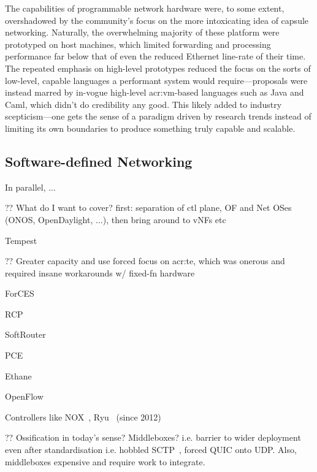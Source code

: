 The capabilities of programmable network hardware were, to some extent, overshadowed by the community's focus on the more intoxicating idea of capsule networking.
Naturally, the overwhelming majority of these platform were prototyped on host machines, which limited forwarding and processing performance far below that of even the reduced Ethernet line-rate of their time.
The repeated emphasis on high-level prototypes reduced the focus on the sorts of low-level, capable languages a performant system would require---proposals were instead marred by in-vogue high-level \gls{acr:vm}-based languages such as Java and Caml, which didn't do credibility any good.
This likely added to industry scepticism---one gets the sense of a paradigm driven by research trends instead of limiting its own boundaries to produce something truly capable and scalable.

\subsection{Software-defined Networking}
In parallel, ...

?? What do I want to cover? first: separation of ctl plane, OF and Net OSes (ONOS, OpenDaylight, ...), then bring around to vNFs etc

Tempest~\parencite{DBLP:journals/network/MerweRLC98}

?? Greater capacity and use forced focus on \gls{acr:te}, which was onerous and required insane workarounds w/ fixed-fn hardware~\parencite{DBLP:journals/ccr/FeamsterRZ14}

ForCES~\parencite{rfc3746}

RCP~\parencite{DBLP:conf/nsdi/CaesarCFRSM05,10.1145/1016707.1016709}

SoftRouter~~\parencite{lakshman2004the}

PCE~\parencite{rfc4655}

Ethane~\parencite{DBLP:conf/sigcomm/CasadoFPLMS07}

OpenFlow~\parencite{DBLP:journals/ccr/McKeownABPPRST08}

Controllers like NOX~\parencite{DBLP:journals/ccr/GudeKPPCMS08}, Ryu~\parencite{ryu} (since 2012)

?? Ossification in today's sense? Middleboxes? i.e. barrier to wider deployment even after standardisation i.e. hobbled SCTP~\parencite{rfc4960}, forced QUIC onto UDP. Also, middleboxes expensive and require work to integrate.

